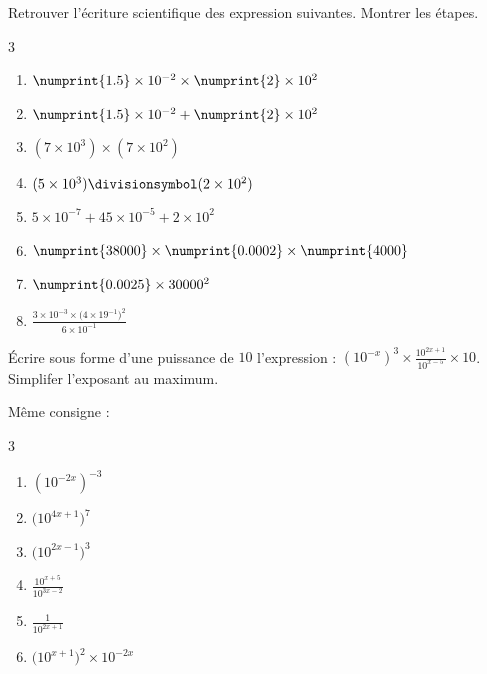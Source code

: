 \begin{exercise}[\cancel{\faCalculator}] Retrouver l'écriture scientifique des expression suivantes. Montrer les étapes. 
	\begin{multicols}{3} 
		\begin{enumerate}[label={\alph*)\rule{0pt}{1.8em}},leftmargin=*]
			\item $\numprint{1.5}\times 10^{-2}\times \numprint{2}\times 10^2$
			\item $\numprint{1.5}\times 10^{-2}+ \numprint{2}\times 10^2$ 
			\item $(7\times10^3 )\times ( 7\times 10^2)$
			\item $(5\times10^3 )\divisionsymbol ( 2\times 10^2)$
			\item $5\times10^{-7} + 45\times 10^{-5}+2\times 10^{2}$
			\item $\numprint{38000}\times \numprint{0.0002}\times \numprint{4000}$
			\item  $\numprint{0.0025}\times 30000^2$
			\item $\frac{3\times 10^{-3}\times \big( 4\times 19^{-1}\big)^2}{6\times 10^{-1}}$
		\end{enumerate}
	\end{multicols} 
\end{exercise}
\begin{example}[Je fais]
	Écrire sous forme d'une puissance de $10$ l'expression : $(10^{-x})^3 \times  \frac{10^{2x+1} }{10^{x-5}} \times 10$. Simplifer l'exposant au maximum.
	
	
	
\end{example}
\begin{exercise} Même consigne :
	\begin{multicols}{3} 
		\begin{enumerate}[label={\alph*)\rule{0pt}{1.8em}},leftmargin=*]
			\item $\left(10^{-2x}\right)^{-3}$  
			\item $\big(10^{4x+1}\big)^7$ 
			\item $\big(10^{2x-1}\big)^3$ 
			\item $\frac{10^{x+5}}{10^{3x-2}}$
			\item $\frac{1}{10^{2x+1}}$
			\item $\big(10^{x+1}\big)^2\times 10^{-2x}$
		\end{enumerate}
	\end{multicols} 
\end{exercise}
